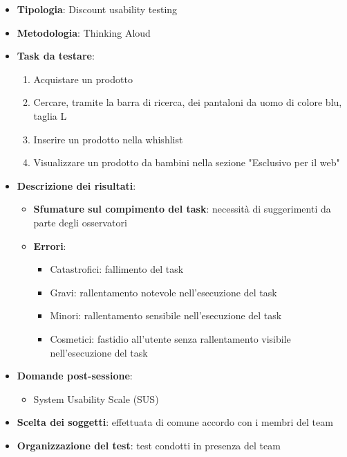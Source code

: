 \documentclass[12pt,italian,]{report}
\providecommand{\tightlist}{%
  \setlength{\itemsep}{0pt}\setlength{\parskip}{0pt}}
\begin{document}
\begin{itemize}
\item
  \textbf{Tipologia}: Discount usability testing
\item
  \textbf{Metodologia}: Thinking Aloud
\item
  \textbf{Task da testare}: 
  
  \begin{enumerate}
  \def\labelenumi{\arabic{enumi}.}
  \tightlist
  \item
    Acquistare un prodotto
  \item
    Cercare, tramite la barra di ricerca, dei pantaloni da uomo di colore blu, taglia L
  \item
    Inserire un prodotto nella whishlist
  \item
    Visualizzare un prodotto da bambini nella sezione "Esclusivo per il web"
  \end{enumerate}
\item
  \textbf{Descrizione dei risultati}:

  \begin{itemize}
  \item
    \textbf{Sfumature sul compimento del task}: necessità di
    suggerimenti da parte degli osservatori
  \item
    \textbf{Errori}:

    \begin{itemize}
   
    \item
      Catastrofici: fallimento del task
    \item
      Gravi: rallentamento notevole nell'esecuzione del task
    \item
      Minori: rallentamento sensibile nell'esecuzione del task
    \item
      Cosmetici: fastidio all'utente senza rallentamento visibile
      nell'esecuzione del task
    \end{itemize}
  \end{itemize}
\item
  \textbf{Domande post-sessione}:

  \begin{itemize}
  \tightlist
  \item
    System Usability Scale (SUS)
  \end{itemize}
\item
  \textbf{Scelta dei soggetti}: effettuata di comune accordo con i
  membri del team
\item
  \textbf{Organizzazione del test}: test condotti in presenza del team
\end{itemize}
\end{document}
